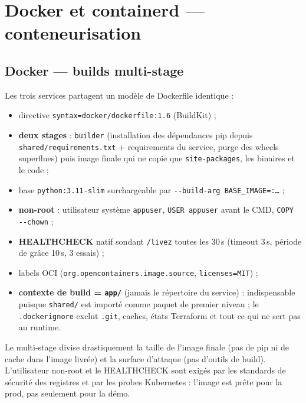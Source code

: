 \documentclass[11pt,a4paper]{article}
\begin{document}
\section{Docker et containerd --- conteneurisation}

\subsection{Docker --- builds multi-stage}
Les trois services partagent un modèle de Dockerfile identique :
\begin{itemize}[itemsep=1pt]
  \item directive \texttt{syntax=docker/dockerfile:1.6} (BuildKit) ;
  \item \textbf{deux stages} : \texttt{builder} (installation des dépendances pip depuis \texttt{shared/requirements.txt} + requirements du service, purge des wheels superflues) puis image finale qui ne copie que \texttt{site-packages}, les binaires et le code ;
  \item base \texttt{python:3.11-slim} surchargeable par \texttt{-{}-build-arg BASE\_IMAGE=:\ldots} ;
  \item \textbf{non-root} : utilisateur système \texttt{appuser}, \texttt{USER appuser} avant le CMD, \texttt{COPY -{}-chown} ;
  \item \textbf{HEALTHCHECK} natif sondant \texttt{/livez} toutes les 30\,s (timeout 3\,s, période de grâce 10\,s, 3 essais) ;
  \item labels OCI (\texttt{org.opencontainers.image.source}, \texttt{licenses=MIT}) ;
  \item \textbf{contexte de build = \texttt{app/}} (jamais le répertoire du service) : indispensable puisque \texttt{shared/} est importé comme paquet de premier niveau ; le \texttt{.dockerignore} exclut \texttt{.git}, caches, états Terraform et tout ce qui ne sert pas au runtime.
\end{itemize}

\begin{whybox}
Le multi-stage divise drastiquement la taille de l'image finale (pas de pip ni de cache dans l'image livrée) et la surface d'attaque (pas d'outils de build). L'utilisateur non-root et le HEALTHCHECK sont exigés par les standards de sécurité des registres et par les probes Kubernetes : l'image est prête pour la prod, pas seulement pour la démo.
\end{whybox}
\end{document}
